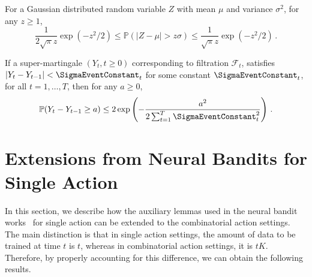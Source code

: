 \documentclass{article}
\theoremstyle{plain}
\begin{document}
\begin{lemma} \label{lemma_anti-concentraion}
\cite{abramowitz1964handbook}
For a Gaussian distributed random variable $Z$ with mean $\mu$ and variance $\sigma^2$, for any $z \ge 1$, 
    \begin{equation*}
        \frac{1}{2\sqrt{\pi}z} \exp({-z^2/2}) \le \mathbb{P}(\left| Z - \mu \right| > z \sigma) \le \frac{1}{\sqrt{\pi}z} \exp({-z^2/2}) \, .
    \end{equation*}
\end{lemma}

\begin{lemma} \label{lemma_Azuma}
If a super-martingale $(Y_t, t \ge 0)$ corresponding to filtration $\mathcal{F}_t$, satisfies $\left| Y_t - Y_{t-1} \right| < \SigmaEventConstant_t$ for some constant $\SigmaEventConstant_t$, for all $t=1,\ldots,T$, then for any $a \ge 0$,
    \begin{equation*}
        \mathbb{P} ( Y_t - Y_{t-1} \ge a ) \le 2\exp \left({-\frac{a^2}{2 \sum_{t=1}^{T} \SigmaEventConstant_t^2}}\right) \, .
    \end{equation*}
\end{lemma}

\section{Extensions from Neural Bandits for Single Action}

In this section, we describe how the auxiliary lemmas used in the neural bandit works~\citep{zhou2020neural, zhang2021neural} for single action can be extended to the combinatorial action settings.
The main distinction is that in single action settings, the amount of data to be trained at time $t$ is $t$, whereas in combinatorial action settings, it is $tK$. Therefore, by properly accounting for this difference, we can obtain the following results.
\end{document}

